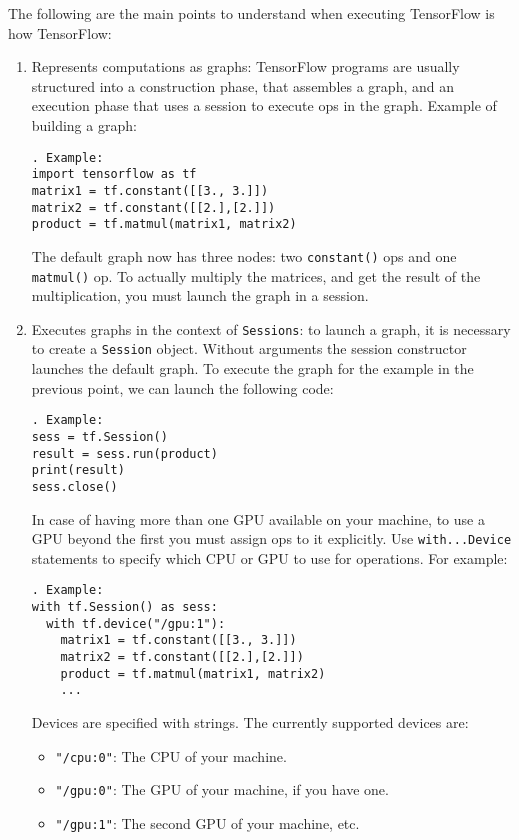 \documentclass[11pt,a4paper]{article}
\begin{document}
The following are the main points to understand when executing TensorFlow is how TensorFlow: 
\begin{enumerate}
	\item Represents computations as graphs: TensorFlow programs are usually structured into a construction phase, that assembles a graph, and an execution phase that uses a session to execute ops in the graph. Example of building a graph: 
	\begin{lstlisting}. Example: 
import tensorflow as tf
matrix1 = tf.constant([[3., 3.]])
matrix2 = tf.constant([[2.],[2.]])
product = tf.matmul(matrix1, matrix2)
\end{lstlisting}
The default graph now has three nodes: two \texttt{constant()} ops and one \texttt{matmul()} op. To actually multiply the matrices, and get the result of the multiplication, you must launch the graph in a session.
	\item Executes graphs in the context of \texttt{Sessions}: to launch a graph, it is necessary to create a \texttt{Session} object. Without arguments the session constructor launches the default graph. To execute the graph for the example in the previous point, we can launch the following code: 
	\begin{lstlisting}. Example: 
sess = tf.Session()
result = sess.run(product)
print(result)
sess.close() 
\end{lstlisting}
	In case of having more than one GPU available on your machine, to use a GPU beyond the first you must assign ops to it explicitly. Use \texttt{with...Device} statements to specify which CPU or GPU to use for operations. For example: 
	\begin{lstlisting}. Example: 
with tf.Session() as sess:
  with tf.device("/gpu:1"):
    matrix1 = tf.constant([[3., 3.]])
    matrix2 = tf.constant([[2.],[2.]])
    product = tf.matmul(matrix1, matrix2)
    ...
\end{lstlisting}
	Devices are specified with strings. The currently supported devices are: 
	\begin{itemize}	
		\item \texttt{"/cpu:0"}: The CPU of your machine. 
		\item \texttt{"/gpu:0"}: The GPU of your machine, if you have one. 
		\item \texttt{"/gpu:1"}: The second GPU of your machine, etc. 
	\end{itemize}
	

\end{enumerate}
\end{document}

